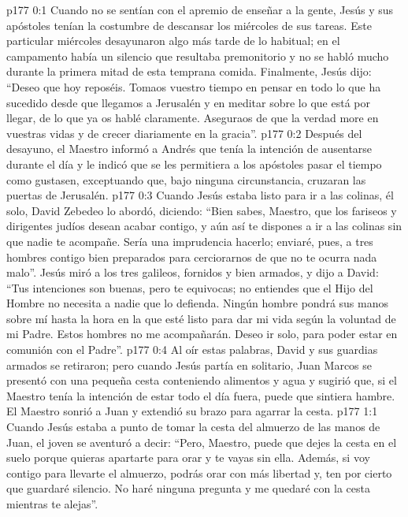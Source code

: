 \author{Comisión de seres intermedios}
\vs p177 0:1 Cuando no se sentían con el apremio de enseñar a la gente, Jesús y sus apóstoles tenían la costumbre de descansar los miércoles de sus tareas. Este particular miércoles desayunaron algo más tarde de lo habitual; en el campamento había un silencio que resultaba premonitorio y no se habló mucho durante la primera mitad de esta temprana comida. Finalmente, Jesús dijo: “Deseo que hoy reposéis. Tomaos vuestro tiempo en pensar en todo lo que ha sucedido desde que llegamos a Jerusalén y en meditar sobre lo que está por llegar, de lo que ya os hablé claramente. Aseguraos de que la verdad more en vuestras vidas y de crecer diariamente en la gracia”.
\vs p177 0:2 Después del desayuno, el Maestro informó a Andrés que tenía la intención de ausentarse durante el día y le indicó que se les permitiera a los apóstoles pasar el tiempo como gustasen, exceptuando que, bajo ninguna circunstancia, cruzaran las puertas de Jerusalén.
\vs p177 0:3 Cuando Jesús estaba listo para ir a las colinas, él solo, David Zebedeo lo abordó, diciendo: “Bien sabes, Maestro, que los fariseos y dirigentes judíos desean acabar contigo, y aún así te dispones a ir a las colinas sin que nadie te acompañe. Sería una imprudencia hacerlo; enviaré, pues, a tres hombres contigo bien preparados para cerciorarnos de que no te ocurra nada malo”. Jesús miró a los tres galileos, fornidos y bien armados, y dijo a David: “Tus intenciones son buenas, pero te equivocas; no entiendes que el Hijo del Hombre no necesita a nadie que lo defienda. Ningún hombre pondrá sus manos sobre mí hasta la hora en la que esté listo para dar mi vida según la voluntad de mi Padre. Estos hombres no me acompañarán. Deseo ir solo, para poder estar en comunión con el Padre”.
\vs p177 0:4 Al oír estas palabras, David y sus guardias armados se retiraron; pero cuando Jesús partía en solitario, Juan Marcos se presentó con una pequeña cesta conteniendo alimentos y agua y sugirió que, si el Maestro tenía la intención de estar todo el día fuera, puede que sintiera hambre. El Maestro sonrió a Juan y extendió su brazo para agarrar la cesta.
\vs p177 1:1 Cuando Jesús estaba a punto de tomar la cesta del almuerzo de las manos de Juan, el joven se aventuró a decir: “Pero, Maestro, puede que dejes la cesta en el suelo porque quieras apartarte para orar y te vayas sin ella. Además, si voy contigo para llevarte el almuerzo, podrás orar con más libertad y, ten por cierto que guardaré silencio. No haré ninguna pregunta y me quedaré con la cesta mientras te alejas”.
